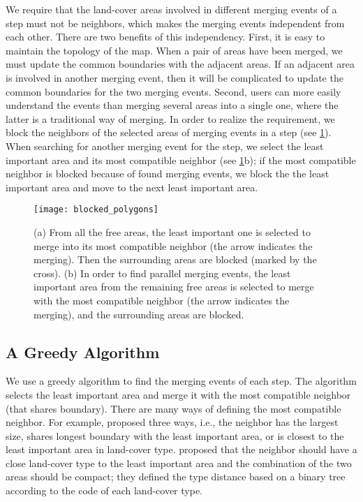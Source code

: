 \documentclass[ijgi,article,submit,moreauthors,pdftex]{Definitions/mdpi}
\begin{document}
We require that 
the land-cover areas involved in different merging events of a step 
must not be neighbors, 
which makes the merging events independent from each other.
There are two benefits of this independency.
First, it is easy to maintain the topology of the map.
When a pair of areas have been merged, 
we must update the common boundaries with the adjacent areas.
If an adjacent area is involved in another merging event,
then it will be complicated to update the common boundaries 
for the two merging events.
Second, users can more easily understand the events 
than merging several areas into a single one,
where the latter is a traditional way of merging.
In order to realize the requirement, 
we block the neighbors of the selected areas of merging events in a step
(see \fig\ref{fig:blocked_polygons}).
When searching for another merging event for the step, 
we select the least important area and its most compatible neighbor
(see \fig\ref{fig:blocked_polygons}b);
if the most compatible neighbor is blocked because of found merging events,
we block the the least important area 
and move to the next least important area.

\begin{figure}[tb]
\centering
\texttt{[image: blocked\_polygons]}
\caption{(a) From all the free areas,
the least important one is selected to merge into
its most compatible neighbor (the arrow indicates the merging).
Then the surrounding areas are blocked (marked by the cross).
(b) In order to find parallel merging events, 
the least important area from the remaining free areas
is selected to merge with the most compatible neighbor
(the arrow indicates the merging),
and the surrounding areas are blocked.
}
\label{fig:blocked_polygons}
\end{figure}



\subsection{A Greedy Algorithm}
\label{sec:greedy_algo}


We use a greedy algorithm to find the merging events of each step.
The algorithm selects the least important area and merge it with
the most compatible neighbor (that shares boundary).
There are many ways of defining the most compatible neighbor.
For example, \citet{Cheng2006} proposed three ways, i.e.,
the neighbor has the largest size, 
shares longest boundary with the least important area,
or is closest to the least important area in land-cover type. 
\citet{Peng2017AStar} proposed that 
the neighbor should have a close land-cover type
to the least important area
and the combination of the two areas should be compact;
they defined the type distance based on a binary tree
according to the code of each land-cover type.
\end{document}
